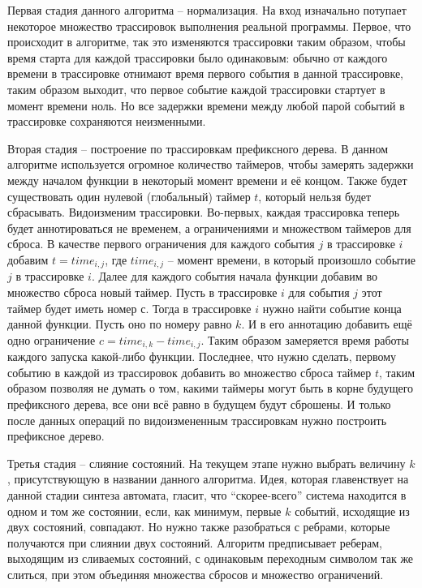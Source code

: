 \documentclass[times,specification,annotation]{itmo-student-thesis}
\begin{document}
Первая стадия данного алгоритма -- нормализация. На вход изначально потупает некоторое множество трассировок выполнения реальной программы. Первое, что происходит в алгоритме,
так это изменяются трассировки таким образом, чтобы время старта для каждой трассировки было одинаковым: обычно от каждого времени в трассировке отнимают время первого события
в данной трассировке, таким образом выходит, что первое событие каждой трассировки стартует в момент времени ноль. Но все задержки времени между любой парой событий в трассировке
сохраняются неизменными. 

Вторая стадия -- построение по трассировкам префиксного дерева. В данном алгоритме используется огромное количество таймеров, чтобы замерять задержки между началом функции в некоторый
момент времени и её концом. Также будет существовать один нулевой (глобальный) таймер $t$, который нельзя будет сбрасывать. Видоизменим трассировки. 
Во-первых, каждая трассировка теперь будет аннотироваться не временем, а ограничениями и множеством таймеров для сброса. В качестве первого ограничения для каждого события $j$ в трассировке $i$
добавим $t = time_{i, j}$, где $time_{i, j}$ -- момент времени, в который произошло событие $j$ в трассировке $i$. Далее для каждого события начала функции добавим во множество сброса новый
таймер. Пусть в трассировке $i$ для события $j$ этот таймер будет иметь номер $с$. Тогда в трассировке $i$ нужно найти событие конца данной функции. Пусть оно по номеру равно $k$. И в его
аннотацию добавить ещё одно ограничение $c = time_{i, k} - time_{i, j}$. Таким образом замеряется время работы каждого запуска какой-либо функции. Последнее, что нужно сделать,
первому событию в каждой из трассировок добавить во множество сброса таймер $t$, таким образом позволяя не думать о том, какими таймеры могут быть в корне будущего префиксного дерева, все они всё равно
в будущем будут сброшены. И только после данных операций по видоизмененным трассировкам нужно построить префиксное дерево.

Третья стадия -- слияние состояний. На текущем этапе нужно выбрать величину $k$, присутствующую в названии данного алгоритма. Идея, которая главенствует на данной стадии синтеза автомата,
гласит, что ``скорее-всего'' система находится в одном и том же состоянии, если, как минимум, первые $k$ событий, исходящие из двух состояний, совпадают. Но нужно также разобраться с ребрами, которые
получаются при слиянии двух состояний. Алгоритм предписывает реберам, выходящим из сливаемых состояний, с одинаковым переходным символом так же слиться, при этом объединяя множества сбросов и
множество ограничений. 
\end{document}
